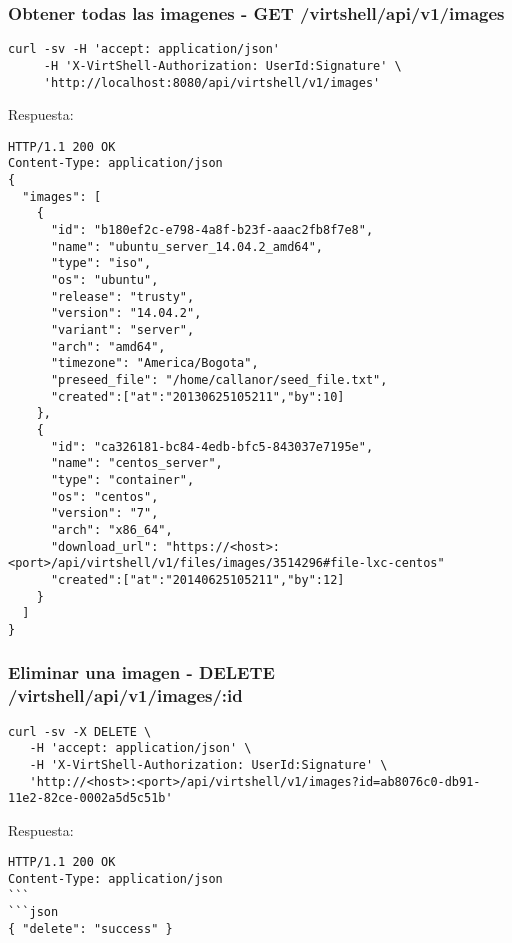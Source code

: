 \subsubsection{Obtener todas las imagenes - GET /virtshell/api/v1/images}

\begin{lstlisting}[style=json]
curl -sv -H 'accept: application/json' 
     -H 'X-VirtShell-Authorization: UserId:Signature' \ 
     'http://localhost:8080/api/virtshell/v1/images'
\end{lstlisting}

\vspace{1cm}
Respuesta:
\vspace{1cm}

\begin{lstlisting}[style=json]
HTTP/1.1 200 OK
Content-Type: application/json
{
  "images": [
    {
      "id": "b180ef2c-e798-4a8f-b23f-aaac2fb8f7e8",
      "name": "ubuntu_server_14.04.2_amd64",
      "type": "iso",
      "os": "ubuntu", 
      "release": "trusty",
      "version": "14.04.2", 
      "variant": "server", 
      "arch": "amd64", 
      "timezone": "America/Bogota", 
      "preseed_file": "/home/callanor/seed_file.txt",
      "created":["at":"20130625105211","by":10]
    },
    {
      "id": "ca326181-bc84-4edb-bfc5-843037e7195e",
      "name": "centos_server",
      "type": "container",
      "os": "centos", 
      "version": "7", 
      "arch": "x86_64", 
      "download_url": "https://<host>:<port>/api/virtshell/v1/files/images/3514296#file-lxc-centos"
      "created":["at":"20140625105211","by":12]
    }
  ]
}  
\end{lstlisting}

\subsubsection{Eliminar una imagen - DELETE /virtshell/api/v1/images/:id}

\begin{lstlisting}[style=json]
curl -sv -X DELETE \
   -H 'accept: application/json' \
   -H 'X-VirtShell-Authorization: UserId:Signature' \
   'http://<host>:<port>/api/virtshell/v1/images?id=ab8076c0-db91-11e2-82ce-0002a5d5c51b'
\end{lstlisting}

\vspace{1cm}
Respuesta:
\vspace{1cm}

\begin{lstlisting}[style=json]
HTTP/1.1 200 OK
Content-Type: application/json
```
```json
{ "delete": "success" }
\end{lstlisting}
